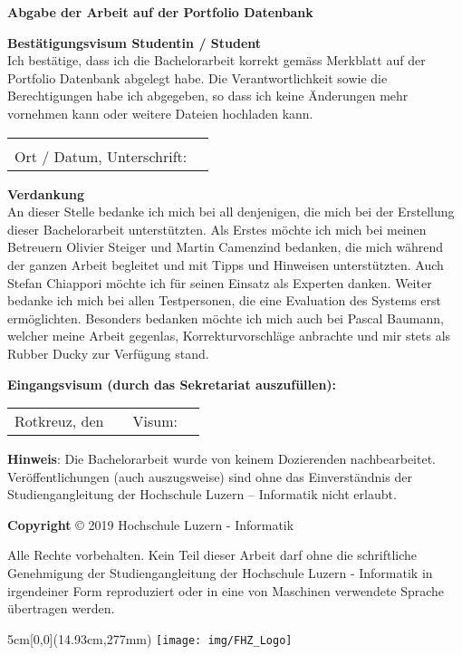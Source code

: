 \noindent
\textbf{Abgabe der Arbeit auf der Portfolio Datenbank}

\vspace{0.5em}

\noindent
\textbf{Bestätigungsvisum Studentin / Student}
\\
\noindent
Ich bestätige, dass ich die Bachelorarbeit korrekt gemäss Merkblatt auf der Portfolio Datenbank abgelegt habe. Die Verantwortlichkeit sowie die Berechtigungen habe ich abgegeben, so dass ich keine Änderungen mehr vornehmen kann oder weitere Dateien hochladen kann.

\vspace{0.7em}

\noindent
\begin{tabularx}{\textwidth}{@{}lX}
	&\\
	Ort / Datum, Unterschrift: &  \\
	\cline{2-2}
\end{tabularx}

\vspace{0.8cm}
\noindent
\textbf{Verdankung}
\\
An dieser Stelle bedanke ich mich bei all denjenigen, die mich bei der Erstellung dieser Bachelorarbeit unterstützten. Als Erstes möchte ich mich bei meinen Betreuern Olivier Steiger und Martin Camenzind bedanken, die mich während der ganzen Arbeit begleitet und mit Tipps und Hinweisen unterstützten. Auch Stefan Chiappori möchte ich für seinen Einsatz als Experten danken. Weiter bedanke ich mich bei allen Testpersonen, die eine Evaluation des Systems erst ermöglichten. Besonders bedanken möchte ich mich auch bei Pascal Baumann, welcher meine Arbeit gegenlas, Korrekturvorschläge anbrachte und mir stets als Rubber Ducky zur Verfügung stand.

\vspace{0.8cm}
\noindent
\textbf{Eingangsvisum (durch das Sekretariat auszufüllen):}

\noindent
\renewcommand{\arraystretch}{2}
\begin{tabularx}{\textwidth}{@{}lXlX}
	Rotkreuz, den & & Visum: & \\
	\cline{2-2}
	\cline{4-4}
\end{tabularx}
\renewcommand{\arraystretch}{1}

\vfill
\noindent
\textbf{Hinweis}: Die Bachelorarbeit wurde von keinem Dozierenden nachbearbeitet. Veröffentlichungen (auch auszugsweise) sind ohne das Einverständnis der Studiengangleitung der Hochschule Luzern – Informatik nicht erlaubt.

\vspace{1em}

\noindent
\textbf{Copyright} © 2019 Hochschule Luzern - Informatik

\vspace{1em}
\noindent
Alle Rechte vorbehalten. Kein Teil dieser Arbeit darf ohne die schriftliche Genehmigung der Studiengangleitung der Hochschule Luzern - Informatik in irgendeiner Form reproduziert oder in eine von Maschinen verwendete Sprache übertragen werden.


\begin{textblock*}{5cm}[0,0](14.93cm,277mm)
	\texttt{[image: img/FHZ\_Logo]}
\end{textblock*}